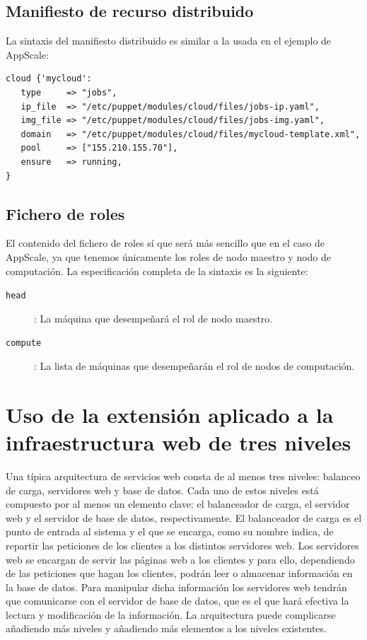 \subsection{Manifiesto de recurso distribuido}

La sintaxis del manifiesto distribuido es similar a la usada en el ejemplo de AppScale:

\begin{lstlisting}
cloud {'mycloud':
   type     => "jobs",
   ip_file  => "/etc/puppet/modules/cloud/files/jobs-ip.yaml",
   img_file => "/etc/puppet/modules/cloud/files/jobs-img.yaml",
   domain   => "/etc/puppet/modules/cloud/files/mycloud-template.xml",
   pool     => ["155.210.155.70"],
   ensure   => running,
}
\end{lstlisting}

\subsection{Fichero de roles}

El contenido del fichero de roles sí que será más sencillo que en el caso de AppScale, ya que tenemos únicamente los roles de nodo maestro y nodo de computación. La especificación completa de la sintaxis es la siguiente:

\begin{description}
\item[\texttt{head}]: La máquina que desempeñará el rol de nodo maestro.
\item[\texttt{compute}]: La lista de máquinas que desempeñarán el rol de nodos de computación.
\end{description}

\section{Uso de la extensión aplicado a la infraestructura web de tres niveles}

Una típica arquitectura de servicios web consta de al menos tres niveles: balanceo de carga, servidores web y base de datos. Cada uno de estos niveles está compuesto por al menos un elemento clave: el balanceador de carga, el servidor web y el servidor de base de datos, respectivamente. El balanceador de carga es el punto de entrada al sistema y el que se encarga, como su nombre indica, de repartir las peticiones de los clientes a los distintos servidores web. Los servidores web se encargan de servir las páginas web a los clientes y para ello, dependiendo de las peticiones que hagan los clientes, podrán leer o almacenar información en la base de datos. Para manipular dicha información los servidores web tendrán que comunicarse con el servidor de base de datos, que es el que hará efectiva la lectura y modificación de la información. La arquitectura puede complicarse añadiendo más niveles y añadiendo más elementos a los niveles existentes.\\

